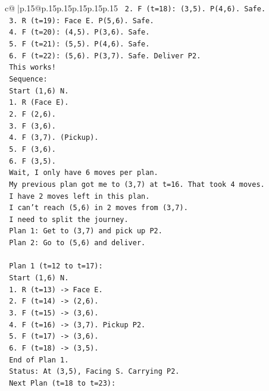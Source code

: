 \documentclass{article}
\begin{document}
{\begin{supertabular}{c@{$\;$}|p{.15\linewidth}@{}p{.15\linewidth}p{.15\linewidth}p{.15\linewidth}p{.15\linewidth}p{.15\linewidth}}
{{{\texttt{   2. F (t=18): (3,5). P(4,6). Safe.} \\
\texttt{   3. R (t=19): Face E. P(5,6). Safe.} \\
\texttt{   4. F (t=20): (4,5). P(3,6). Safe.} \\
\texttt{   5. F (t=21): (5,5). P(4,6). Safe.} \\
\texttt{   6. F (t=22): (5,6). P(3,7). Safe. Deliver P2.} \\
\texttt{   This works!} \\
\texttt{   Sequence:} \\
\texttt{   Start (1,6) N.} \\
\texttt{   1. R (Face E).} \\
\texttt{   2. F (2,6).} \\
\texttt{   3. F (3,6).} \\
\texttt{   4. F (3,7). (Pickup).} \\
\texttt{   5. F (3,6).} \\
\texttt{   6. F (3,5).} \\
\texttt{   Wait, I only have 6 moves per plan.} \\
\texttt{   My previous plan got me to (3,7) at t=16. That took 4 moves.} \\
\texttt{   I have 2 moves left in this plan.} \\
\texttt{   I can't reach (5,6) in 2 moves from (3,7).} \\
\texttt{   I need to split the journey.} \\
\texttt{   Plan 1: Get to (3,7) and pick up P2.} \\
\texttt{   Plan 2: Go to (5,6) and deliver.} \\
\\ 
\texttt{   Plan 1 (t=12 to t=17):} \\
\texttt{   Start (1,6) N.} \\
\texttt{   1. R (t=13) {-}> Face E.} \\
\texttt{   2. F (t=14) {-}> (2,6).} \\
\texttt{   3. F (t=15) {-}> (3,6).} \\
\texttt{   4. F (t=16) {-}> (3,7). Pickup P2.} \\
\texttt{   5. F (t=17) {-}> (3,6).} \\
\texttt{   6. F (t=18) {-}> (3,5).} \\
\texttt{   End of Plan 1.} \\
\texttt{   Status: At (3,5), Facing S. Carrying P2.} \\
\texttt{   Next Plan (t=18 to t=23):} \\
}}}
\end{supertabular}}
\end{document}
